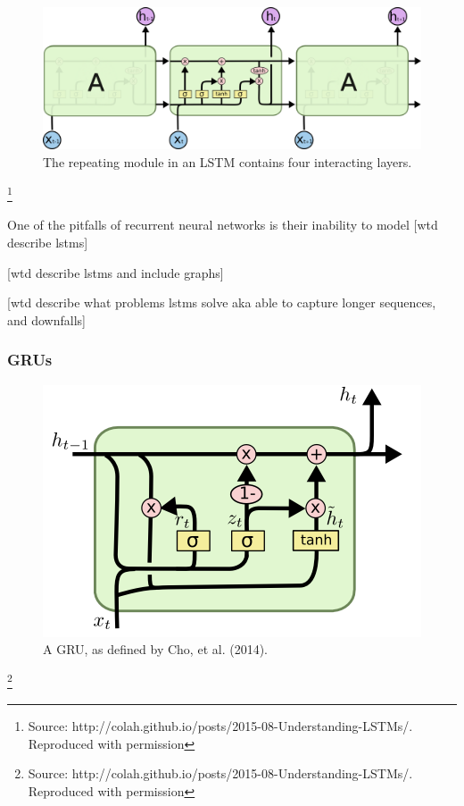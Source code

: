 \begin{figure}[h]
    \centering
	\includegraphics[width=.8\textwidth]{./images/illustrations/LSTM3}
    \caption{The repeating module in an LSTM contains four interacting layers.}
    \label{fig:mesh1}
\end{figure}\footnote{Source: http://colah.github.io/posts/2015-08-Understanding-LSTMs/. Reproduced with permission}





One of the pitfalls of recurrent neural networks is their inability to model [wtd describe lstms]

[wtd describe lstms and include graphs]

[wtd describe what problems lstms solve aka able to capture longer sequences, and downfalls]

\subsubsection{GRUs}

\begin{figure}[h]
    \centering
	\includegraphics[width=.8\textwidth]{./images/illustrations/GRU}
    \caption{A GRU, as defined by Cho, et al. (2014).}
    \label{fig:mesh1}
\end{figure}\footnote{Source: http://colah.github.io/posts/2015-08-Understanding-LSTMs/. Reproduced with permission}



